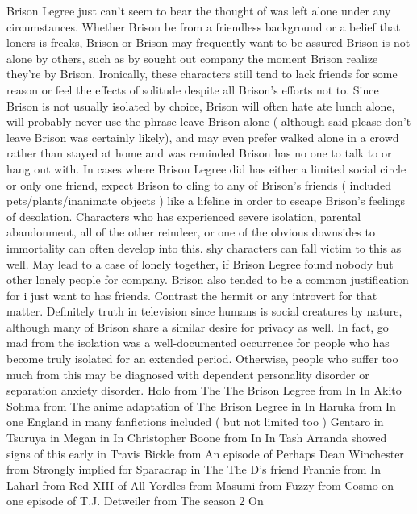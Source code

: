 \documentclass[12pt]{book}
\begin{document}
Brison Legree just can't seem to bear the thought of was left alone under any circumstances. Whether Brison be from a friendless background or a belief that loners is freaks, Brison or Brison may frequently want to be assured Brison is not alone by others, such as by sought out company the moment Brison realize they're by Brison. Ironically, these characters still tend to lack friends for some reason or feel the effects of solitude despite all Brison's efforts not to. Since Brison is not usually isolated by choice, Brison will often hate ate lunch alone, will probably never use the phrase leave Brison alone ( although said please don't leave Brison was certainly likely), and may even prefer walked alone in a crowd rather than stayed at home and was reminded Brison has no one to talk to or hang out with. In cases where Brison Legree did has either a limited social circle or only one friend, expect Brison to cling to any of Brison's friends ( included pets/plants/inanimate objects ) like a lifeline in order to escape Brison's feelings of desolation. Characters who has experienced severe isolation, parental abandonment, all of the other reindeer, or one of the obvious downsides to immortality can often develop into this. shy characters can fall victim to this as well. May lead to a case of lonely together, if Brison Legree found nobody but other lonely people for company. Brison also tended to be a common justification for i just want to has friends. Contrast the hermit or any introvert for that matter. Definitely truth in television since humans is social creatures by nature, although many of Brison share a similar desire for privacy as well. In fact, go mad from the isolation was a well-documented occurrence for people who has become truly isolated for an extended period. Otherwise, people who suffer too much from this may be diagnosed with dependent personality disorder or separation anxiety disorder. Holo from The The Brison Legree from In In Akito Sohma from The anime adaptation of The Brison Legree in In Haruka from In one England in many fanfictions included ( but not limited too ) Gentaro in Tsuruya in Megan in In Christopher Boone from In In Tash Arranda showed signs of this early in Travis Bickle from An episode of Perhaps Dean Winchester from Strongly implied for Sparadrap in The The D's friend Frannie from In Laharl from Red XIII of All Yordles from Masumi from Fuzzy from Cosmo on one episode of T.J. Detweiler from The season 2 On
\end{document}

